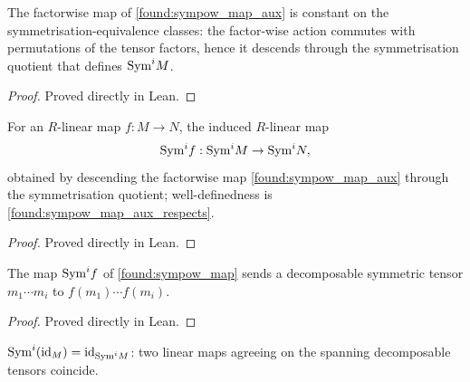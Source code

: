 \begin{lemma}
  \label{found:sympow_map_aux_respects}
  The factorwise map of \cref{found:sympow_map_aux} is constant on the
  symmetrisation-equivalence classes: the factor-wise action commutes with
  permutations of the tensor factors, hence it descends through the
  symmetrisation quotient that defines \(\mathrm{Sym}^i M\).
\end{lemma}

\begin{proof}

\leanok
  Proved directly in Lean.
\end{proof}

\begin{lemma}
  \label{found:sympow_map}
  For an \(R\)-linear map \(f:M\to N\), the induced \(R\)-linear map
  \[
    \mathrm{Sym}^i f:\mathrm{Sym}^i M\to\mathrm{Sym}^i N ,
  \]
  obtained by descending the factorwise map \cref{found:sympow_map_aux} through
  the symmetrisation quotient; well-definedness is
  \cref{found:sympow_map_aux_respects}.
\end{lemma}

\begin{proof}

\leanok
  Proved directly in Lean.
\end{proof}

\begin{lemma}
  \label{found:sympow_map_tprod}
  The map \(\mathrm{Sym}^i f\) of \cref{found:sympow_map} sends a decomposable symmetric
  tensor \(m_1\cdots m_i\) to \(f(m_1)\cdots f(m_i)\).
\end{lemma}

\begin{proof}

\leanok
  Proved directly in Lean.
\end{proof}

\begin{lemma}
  \label{found:sympow_map_id}
  \(\mathrm{Sym}^i(\mathrm{id}_M)=\mathrm{id}_{\mathrm{Sym}^i M}\): two linear maps agreeing on
  the spanning decomposable tensors coincide.
\end{lemma}

